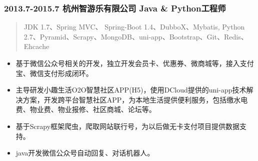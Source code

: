 \subsubsection{2013.7-2015.7 \textbar{} 杭州智游乐有限公司 \textbar{}
Java \&
Python工程师}\label{ux676dux5ddeux667aux6e38ux4e50ux6709ux9650ux516cux53f8-java-pythonux5de5ux7a0bux5e08}

\begin{quote}
JDK 1.7、Spring MVC、 Spring-Boot 1.4、DubboX、Mybatis, Python
2.7、Pyramid、Scrapy、MongoDB、uni-app、Bootstrap、Git、Redis、Ehcache
\end{quote}

\begin{itemize}
\tightlist
\item
  基于微信公众号相关的开发，独立开发会员卡、优惠券、微商城等，接入支付宝、微信支付形成闭环。
\item
  主导研发小趣生活O2O智慧社区APP(H5)，使用DCloud提供的uni-app技术解决方案，开发跨平台智慧社区APP，为本地生活提供便利服务，包括缴水电费、物业费、物业报修、社区商城、论坛等。
\item
  基于Scrapy框架爬虫，爬取网站联行号，为以后做无卡支付项目提供数据支持。
\item
  java开发微信公众号自动回复、对话机器人。
\end{itemize}
